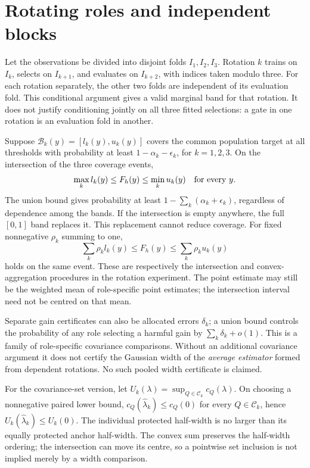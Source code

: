 \section{Rotating roles and independent blocks}
Let the observations be divided into disjoint folds $I_1,I_2,I_3$. Rotation $k$ trains on $I_k$, selects on $I_{k+1}$, and evaluates on $I_{k+2}$, with indices taken modulo three. For each rotation separately, the other two folds are independent of its evaluation fold. This conditional argument gives a valid marginal band for that rotation. It does not justify conditioning jointly on all three fitted selections: a gate in one rotation is an evaluation fold in another.

Suppose $\mathcal B_k(y)=[l_k(y),u_k(y)]$ covers the common population target at all thresholds with probability at least $1-\alpha_k-\epsilon_k$, for $k=1,2,3$. On the intersection of the three coverage events,
\begin{equation}
 \max_k l_k(y)\leq F_h(y)\leq\min_k u_k(y)\quad\hbox{for every }y.
\end{equation}
The union bound gives probability at least $1-\sum_k(\alpha_k+\epsilon_k)$, regardless of dependence among the bands. If the intersection is empty anywhere, the full $[0,1]$ band replaces it. This replacement cannot reduce coverage. For fixed nonnegative $\rho_k$ summing to one,
\[
 \sum_k\rho_kl_k(y)\leq F_h(y)\leq\sum_k\rho_ku_k(y)
\]
holds on the same event. These are respectively the intersection and convex-aggregation procedures in the rotation experiment. The point estimate may still be the weighted mean of role-specific point estimates; the intersection interval need not be centred on that mean.

Separate gain certificates can also be allocated errors $\delta_k$; a union bound controls the probability of any role selecting a harmful gain by $\sum_k\delta_k+o(1)$. This is a family of role-specific covariance comparisons. Without an additional covariance argument it does not certify the Gaussian width of the \emph{average estimator} formed from dependent rotations. No such pooled width certificate is claimed.

For the covariance-set version, let $U_k(\lambda)=\sup_{Q\in\mathcal C_k}c_Q(\lambda)$. On choosing a nonnegative paired lower bound, $c_Q(\widehat\lambda_k)\leq c_Q(0)$ for every $Q\in\mathcal C_k$, hence $U_k(\widehat\lambda_k)\leq U_k(0)$. The individual protected half-width is no larger than its equally protected anchor half-width. The convex sum preserves the half-width ordering; the intersection can move its centre, so a pointwise set inclusion is not implied merely by a width comparison.

